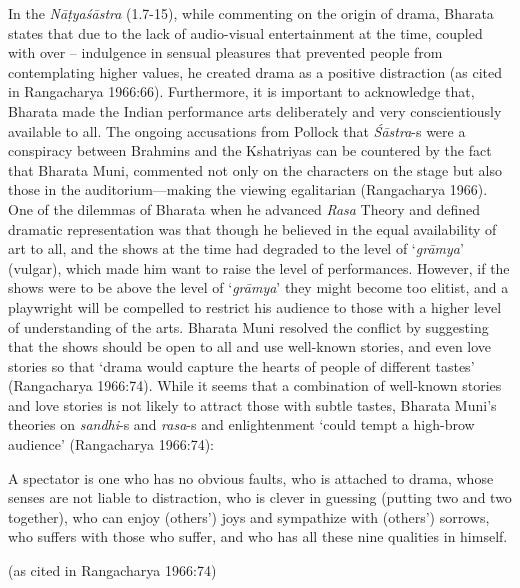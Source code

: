 In the \textsl{Nāṭyaśāstra} (1.7-15), while commenting on the origin of drama, Bharata states that due to the lack of audio-visual entertainment at the time, coupled with over -- indulgence in sensual pleasures that prevented people from contemplating higher values, he created drama as a positive distraction (as cited in Rangacharya 1966:66). Furthermore, it is important to acknowledge that, Bharata made the Indian performance arts deliberately and very conscientiously available to all. The ongoing accusations from Pollock
 that \hbox{\textsl{Śāstra}-s} were a conspiracy between Brahmins and the Kshatriyas can be countered by the fact that Bharata Muni, commented not only on the characters on the stage but also those in the auditorium---making the viewing egalitarian (Rangacharya
 1966). One of the dilemmas of Bharata when he advanced \textsl{Rasa} Theory and defined dramatic representation was that though he believed in the equal availability of art to all, and the shows at the time had degraded to the level of ‘\textsl{grāmya}’ (vulgar), which made him want to raise the level of performances. However, if the shows were to be above the level of ‘\textsl{grāmya}' they might become too elitist, and a playwright will be compelled to restrict his audience to those with a higher level of understanding of the arts. Bharata Muni resolved the conflict by suggesting that the shows should be open to all and use well-known stories, and even love stories so that ‘drama would capture the hearts of people of different tastes’ (Rangacharya 1966:74). While it seems that a combination of well-known stories and love stories is not likely to attract those with subtle tastes, Bharata Muni’s theories on \hbox{\textsl{sandhi}-s} and \textsl{rasa}-s and enlightenment ‘could tempt a high-brow audience’ (Rangacharya 1966:74):

\begin{myquote}
A spectator is one who has no obvious faults, who is attached to drama, whose senses are not liable to distraction, who is clever in guessing (putting two and two together), who can enjoy (others’) joys and sympathize with (others’) sorrows, who suffers with those who suffer, and who has all these nine qualities in himself. 

\hfill (as cited in Rangacharya 1966:74)
\end{myquote}

